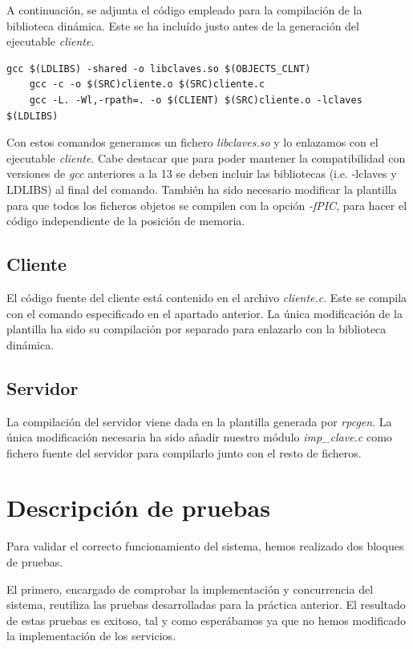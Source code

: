 \documentclass[]{article}
\begin{document}
A continuación, se adjunta el código empleado para la compilación de la biblioteca dinámica. Este se ha incluído justo antes de la generación del ejecutable \textit{cliente}. 
\begin{center}
\begin{lstlisting}[caption=Compiación de biblioteca dinámica]
gcc $(LDLIBS) -shared -o libclaves.so $(OBJECTS_CLNT)
	gcc -c -o $(SRC)cliente.o $(SRC)cliente.c
	gcc -L. -Wl,-rpath=. -o $(CLIENT) $(SRC)cliente.o -lclaves $(LDLIBS)

\end{lstlisting}
\end{center}

Con estos comandos generamos un fichero \textit{libclaves.so} y lo enlazamos con el ejecutable \textit{cliente}. Cabe destacar que para poder mantener la compatibilidad con versiones de \textit{gcc} anteriores a la 13 se deben incluir las bibliotecas (i.e. -lclaves y LDLIBS) al final del comando. También ha sido necesario modificar la plantilla para que todos los ficheros objetos se compilen con la opción \textit{-fPIC}, para hacer el código independiente de la posición de memoria. 

\subsection{Cliente}
\label{subsec:cliente}
El código fuente del cliente está contenido en el archivo \textit{cliente.c}. Este se compila con el comando especificado en el apartado anterior. La única modificación de la plantilla ha sido su compilación por separado para enlazarlo con la biblioteca dinámica. 

\subsection{Servidor}
\label{subsec:compile_server}
La compilación del servidor viene dada en la plantilla generada por \textit{rpcgen}. La única modificación necesaria ha sido añadir nuestro módulo \textit{imp\_clave.c} como fichero fuente del servidor para compilarlo junto con el resto de ficheros. 

\section{Descripción de pruebas}
\label{sec:descripcion_de_pruebas}
Para validar el correcto funcionamiento del sistema, hemos realizado dos bloques de pruebas. 

El primero, encargado de comprobar la implementación y concurrencia del sistema, reutiliza las pruebas desarrolladas para la práctica anterior. El resultado de estas pruebas es exitoso, tal y como esperábamos ya que no hemos modificado la implementación de los servicios.
\end{document}
